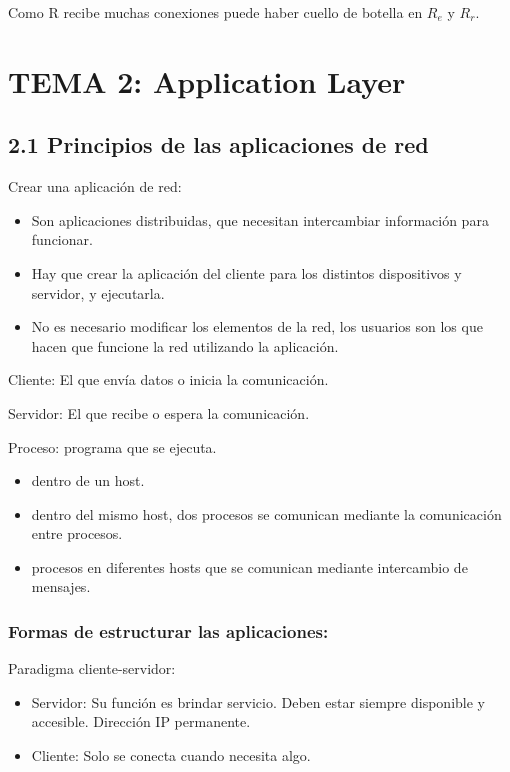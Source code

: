 \documentclass[12pt, twoside, openright]{report} %
\begin{document}
Como R recibe muchas conexiones puede haber cuello de botella en
\(R_e\) y \(R_r\).

\chapter{TEMA 2: Application Layer}

\section{2.1 Principios de las aplicaciones de red}

Crear una aplicación de red:

\begin{itemize}
	\item Son aplicaciones distribuidas, que necesitan intercambiar
	      información para funcionar.
	\item Hay que crear la aplicación del cliente para los distintos
	      dispositivos y servidor, y ejecutarla.
	\item No es necesario modificar los elementos de la red, los usuarios
	      son los que hacen que funcione la red utilizando la aplicación.
\end{itemize}

Cliente: El que envía datos o inicia la comunicación.

Servidor: El que recibe o espera la comunicación.

Proceso: programa que se ejecuta.

\begin{itemize}
	\item dentro de un host.
	\item dentro del mismo host, dos procesos se comunican mediante la
	      comunicación entre procesos.
	\item procesos en diferentes hosts que se comunican mediante intercambio
	      de mensajes.
\end{itemize}


\subsection{Formas de estructurar las aplicaciones:}

Paradigma cliente-servidor:

\begin{itemize}
	\item Servidor: Su función es brindar servicio. Deben estar siempre
	      disponible y accesible. Dirección IP permanente.
	\item Cliente: Solo se conecta cuando necesita algo.
\end{itemize}
\end{document}
